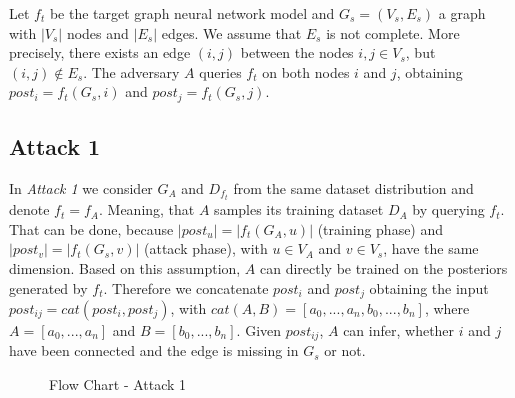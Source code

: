     Let $f_t$ be the target graph neural network model and $G_s = (V_s, E_s)$ a graph with $|V_s|$ nodes and $|E_s|$ edges.
    We assume that $E_s$ is not complete. 
    More precisely, there exists an edge $(i,j)$ between the nodes $i,j \in V_s$, but $(i,j) \not\in E_s$.
    The adversary $A$ queries $f_t$ on both nodes $i$ and $j$, obtaining $post_i = f_t(G_s, i)$ and $post_j = f_t(G_s, j)$.

    \subsection{Attack 1}
      In \emph{Attack 1} we consider $G_A$ and $D_{f_t}$ from the same dataset distribution and denote $f_t = f_A$.
      Meaning, that $A$ samples its training dataset $D_A$ by querying $f_t$.
      That can be done, because $|post_u| = |f_t(G_A,u)|$ (training phase) and $|post_v| = |f_t(G_s,v)|$ (attack phase), with $u \in V_A$ and $v \in V_s$, have the same dimension.
      Based on this assumption, $A$ can directly be trained on the posteriors generated by $f_t$.
      Therefore we concatenate $post_i$ and $post_j$ obtaining the input $post_{ij} = cat(post_i, post_j)$, with $cat(A,B) = [a_0,...,a_n,b_0,...,b_n]$, where $A = [a_0,...,a_n]$ and $B = [b_0,...,b_n]$. 
      Given $post_{ij}$, $A$ can infer, whether $i$ and $j$ have been connected and the edge is missing in $G_s$ or not.

      \vspace{0.48cm}
      \begin{figure}[h!]
        \caption{Flow Chart - Attack 1}
        \label{figure:flow-chart-attack-1}
      \end{figure}

